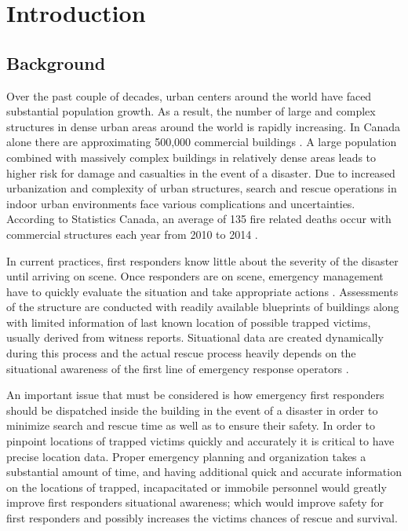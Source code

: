 

\setcounter{section}{0}
\section{Introduction}
\bigskip

\subsection{Background}
Over the past couple of decades, urban centers around the world have faced substantial population growth. As a result, the number of large and complex structures in dense urban areas around the world is rapidly increasing. In Canada alone there are approximating 500,000 commercial buildings \cite{R1}. A large population combined with massively complex buildings in relatively dense areas leads to higher risk for damage and casualties in the event of a disaster. Due to increased urbanization and complexity of urban structures, search and rescue operations in indoor urban environments face various complications and uncertainties. According to Statistics Canada, an average of 135 fire related deaths occur with commercial structures each year from 2010 to 2014 \cite{R2}.

\bigskip
In current practices, first responders know little about the severity of the disaster until arriving on scene. Once responders are on scene, emergency management have to quickly evaluate the situation and take appropriate actions \cite{R3}. Assessments of the structure are conducted with readily available blueprints of buildings along with limited information of last known location of possible trapped victims, usually derived from witness reports. Situational data are created dynamically during this process and the actual rescue process heavily depends on the situational awareness of the first line of emergency response operators \cite{R4}.

\bigskip
An important issue that must be considered is how emergency first responders should be dispatched inside the building in the event of a disaster in order to minimize search and rescue time as well as to ensure their safety. In order to pinpoint locations of trapped victims quickly and accurately it is critical to have precise location data. Proper emergency planning and organization takes a substantial amount of time, and having additional quick and accurate information on the locations of trapped, incapacitated or immobile personnel would greatly improve first responders situational awareness; which would improve safety for first responders and possibly increases the victims chances of rescue and survival.

